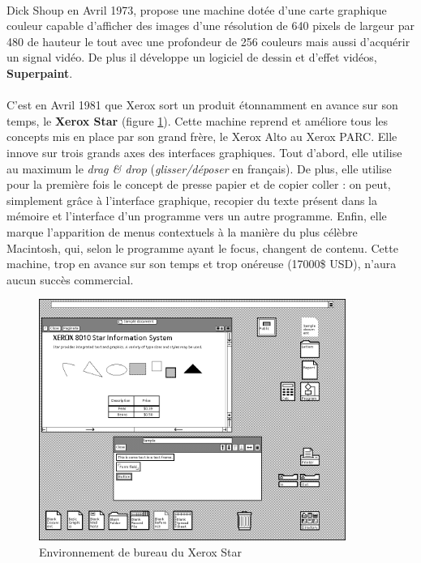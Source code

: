 \paragraph{}
Dick Shoup en Avril 1973, propose une machine dotée d'une carte graphique couleur capable d'afficher des images d'une résolution de 640 pixels de largeur par 480 de hauteur le tout avec une profondeur de 256 couleurs mais aussi d'acquérir un signal vidéo. De plus il développe un logiciel de dessin et d'effet vidéos, \textbf{Superpaint}. 


\paragraph{}
C'est en Avril 1981 que Xerox sort un produit étonnamment en avance sur son temps, le \textbf{Xerox Star} (figure \ref{fig:xerox_star}). Cette machine reprend et améliore tous les concepts mis en place par son grand frère, le Xerox Alto au Xerox PARC. Elle innove sur trois grands axes des interfaces graphiques. Tout d'abord, elle utilise au maximum le \textit{drag \& drop} (\textit{glisser/déposer} en français). De plus, elle utilise pour la première fois le concept de presse papier et de copier coller : on peut, simplement grâce à l'interface graphique, recopier du texte présent dans la mémoire et l'interface d'un programme vers un autre programme. Enfin, elle marque l'apparition de menus contextuels à la manière du plus célèbre Macintosh, qui, selon le programme ayant le focus, changent de contenu. Cette machine, trop en avance sur son temps et trop onéreuse (17000\$ USD), n'aura aucun succès commercial.

\begin{figure}[H]
  \centering
    \includegraphics[width=10cm]{figures/xerox_star.jpg}
  \caption{Environnement de bureau du Xerox Star \cite{aresluna}}
  \label{fig:xerox_star}
\end{figure}

